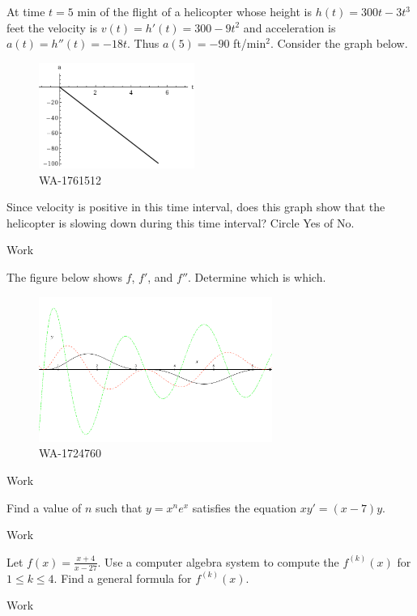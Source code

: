 \documentclass[12pt,addpoints, answers, fleqn]{exam}
\begin{document}
\begin{teacher}
\begin{questions}
At time $t = 5$ min of the flight of a helicopter whose height is $h\left(t\right) = 300t - 3t^3$ feet the velocity is $v\left(t\right) = h'\left(t\right) = 300 - 9t^2$ and acceleration is $a\left(t\right) = h''\left(t\right) = -18t$. Thus $a\left(5\right) = -90$ ft/min$^2$. Consider the graph below.
\begin{figure}[htbp] %
   \centering
   \includegraphics[width=2in]{./graphics/1761512.pdf} 
   \caption{	WA-1761512}
   \label{fig:1761512}
\end{figure}
Since velocity is positive in this time interval, does this graph show that the helicopter is slowing down during this time interval? Circle Yes of No.
\begin{solution}
Work
\end{solution}


\question 	%

The figure below shows $f$, $f'$, and $f''$. Determine which is which.
\begin{figure}[htbp] %
   \centering
   \includegraphics[width=3in]{./graphics/1724760.pdf} 
   \caption{WA-1724760}
   \label{fig:1724760}
\end{figure}
\begin{solution}
Work
\end{solution}
\question 	%

Find a value of $n$ such that $y = x^ne^x$ satisfies the equation $xy' = \left(x - 7\right)y$.

\begin{solution}
Work
\end{solution}
\question 	%

Let $f\left(x\right) = \displaystyle \frac{x+4}{x-27}$. Use a computer algebra system to compute the $f^{\left(k\right)}\left(x\right)$ for $1 \leq k \leq 4$. Find a general formula for $f^{\left(k\right)}\left(x\right)$.
\begin{solution}
Work
\end{solution}

\end{questions}
\end{teacher}
\vfill
\pagebreak
\end{document}

